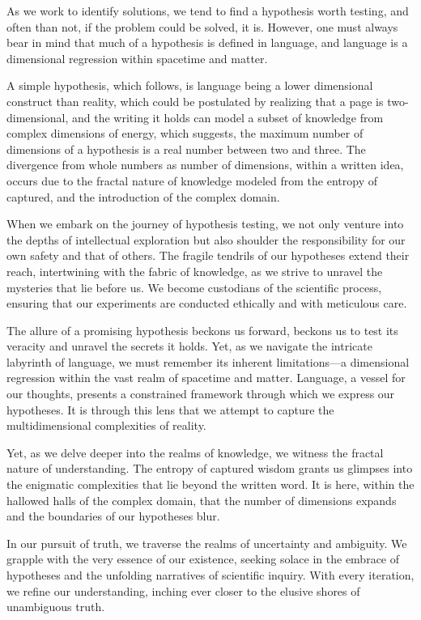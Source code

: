 \documentclass[ebook,12pt,oneside,openany]{memoir}
\begin{document}
\indent 	As we work to identify solutions, we tend to find a hypothesis worth testing, and often than not, if the problem could be solved, it is. However, one must always bear in mind that much of a hypothesis is defined in language, and language is a dimensional regression within spacetime and matter.

\indent 	A simple hypothesis, which follows, is language being a lower dimensional construct than reality, which could be postulated by realizing that a page is two-dimensional, and the writing it holds can model a subset of knowledge from complex dimensions of energy,  which suggests, the maximum number of dimensions of a hypothesis is a real number between two and three. The divergence from whole numbers as number of dimensions, within a written idea, occurs due to the fractal nature of knowledge modeled from the entropy of captured, and the introduction of the complex domain.

\indent When we embark on the journey of hypothesis testing, we not only venture into the depths of intellectual exploration but also shoulder the responsibility for our own safety and that of others. The fragile tendrils of our hypotheses extend their reach, intertwining with the fabric of knowledge, as we strive to unravel the mysteries that lie before us. We become custodians of the scientific process, ensuring that our experiments are conducted ethically and with meticulous care.

\indent The allure of a promising hypothesis beckons us forward, beckons us to test its veracity and unravel the secrets it holds. Yet, as we navigate the intricate labyrinth of language, we must remember its inherent limitations—a dimensional regression within the vast realm of spacetime and matter. Language, a vessel for our thoughts, presents a constrained framework through which we express our hypotheses. It is through this lens that we attempt to capture the multidimensional complexities of reality.

\indent Yet, as we delve deeper into the realms of knowledge, we witness the fractal nature of understanding. The entropy of captured wisdom grants us glimpses into the enigmatic complexities that lie beyond the written word. It is here, within the hallowed halls of the complex domain, that the number of dimensions expands and the boundaries of our hypotheses blur.

\indent In our pursuit of truth, we traverse the realms of uncertainty and ambiguity. We grapple with the very essence of our existence, seeking solace in the embrace of hypotheses and the unfolding narratives of scientific inquiry. With every iteration, we refine our understanding, inching ever closer to the elusive shores of unambiguous truth.
\end{document}
